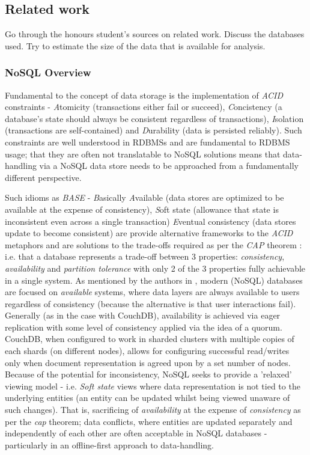 \subsection{Related work}
Go through the honours student's sources on related work. Discuss the databases used. Try to estimate the size of the data that is available for analysis.

\subsubsection*{NoSQL Overview}
Fundamental to the concept of data storage is the implementation of \textit{ACID} constraints - \textit{A}tomicity (transactions either fail or succeed), \textit{C}oncistency (a database's state should always be consistent regardless of transactions), \textit{I}solation (transactions are self-contained) and \textit{D}urability (data is persisted reliably). Such constraints are well understood in RDBMSs and are fundamental to RDBMS usage; that they are often not translatable to NoSQL solutions means that data-handling via a NoSQL data store needs to be approached from a fundamentally different perspective.

Such idioms as \textit{BASE} - \textit{B}asically \textit{A}vailable (data stores are optimized to be available at the expense of consistency), \textit{S}oft state (allowance that state is inconsistent even across a single transaction) \textit{E}ventual consistency (data stores update to become consistent) are provide alternative frameworks to the \textit{ACID} metaphors and are solutions to the trade-offs required as per the \textit{CAP} theorem \cite{GANESHCHANDRA201513}: i.e. that a database represents a trade-off between 3 properties: \textit{consistency}, \textit{availability} and \textit{partition tolerance} with only 2 of the 3 properties fully achievable in a single system. As mentioned by the authors in \cite{GANESHCHANDRA201513}, modern (NoSQL) databases are focused on \textit{available} systems, where data layers are always available to users regardless of consistency (because the alternative is that user interactions fail). Generally (as in the case with CouchDB), availability is achieved via eager replication with some level of consistency applied via the idea of a quorum. CouchDB, when configured to work in sharded clusters with multiple copies of each shards (on different nodes), allows for configuring successful read/writes only when document representation is agreed upon by a set number of nodes. Because of the potential for inconsistency, NoSQL seeks to provide a 'relaxed' viewing model - i.e. \textit{Soft state} views where data representation is not tied to the underlying entities (an entity can be updated whilst being viewed unaware of such changes). That is, sacrificing of \textit{availability} at the expense of \textit{consistency} as per the \textit{cap} theorem; data conflicts, where entities are updated separately and independently of each other are often acceptable in NoSQL databases - particularly in an offline-first approach to data-handling.

